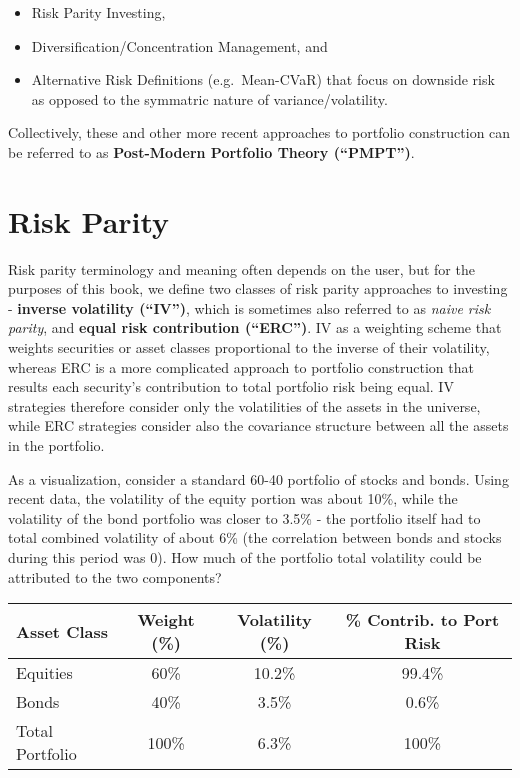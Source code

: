 \documentclass[]{book}
\providecommand{\tightlist}{%
  \setlength{\itemsep}{0pt}\setlength{\parskip}{0pt}}
\theoremstyle{definition}
\theoremstyle{definition}
\theoremstyle{definition}
\theoremstyle{remark}
\begin{document}
\begin{itemize}
\tightlist
\item
  Risk Parity Investing,
\item
  Diversification/Concentration Management, and
\item
  Alternative Risk Definitions (e.g.~Mean-CVaR) that focus on downside
  risk as opposed to the symmatric nature of variance/volatility.
\end{itemize}

Collectively, these and other more recent approaches to portfolio
construction can be referred to as \textbf{Post-Modern Portfolio Theory
(``PMPT'')}.

\section{Risk Parity}\label{risk-parity}

Risk parity terminology and meaning often depends on the user, but for
the purposes of this book, we define two classes of risk parity
approaches to investing - \textbf{inverse volatility (``IV'')}, which is
sometimes also referred to as \emph{naive risk parity}, and
\textbf{equal risk contribution (``ERC'')}. IV as a weighting scheme
that weights securities or asset classes proportional to the inverse of
their volatility, whereas ERC is a more complicated approach to
portfolio construction that results each security's contribution to
total portfolio risk being equal. IV strategies therefore consider only
the volatilities of the assets in the universe, while ERC strategies
consider also the covariance structure between all the assets in the
portfolio.

As a visualization, consider a standard 60-40 portfolio of stocks and
bonds. Using recent data, the volatility of the equity portion was about
10\%, while the volatility of the bond portfolio was closer to 3.5\% -
the portfolio itself had to total combined volatility of about 6\% (the
correlation between bonds and stocks during this period was 0). How much
of the portfolio total volatility could be attributed to the two
components?

\begin{longtable}[]{@{}lccc@{}}
\toprule
Asset Class & Weight (\%) & Volatility (\%) & \% Contrib. to Port
Risk\tabularnewline
\midrule
\endhead
Equities & 60\% & 10.2\% & 99.4\%\tabularnewline
Bonds & 40\% & 3.5\% & 0.6\%\tabularnewline
Total Portfolio & 100\% & 6.3\% & 100\%\tabularnewline
\bottomrule
\end{longtable}
\end{document}
